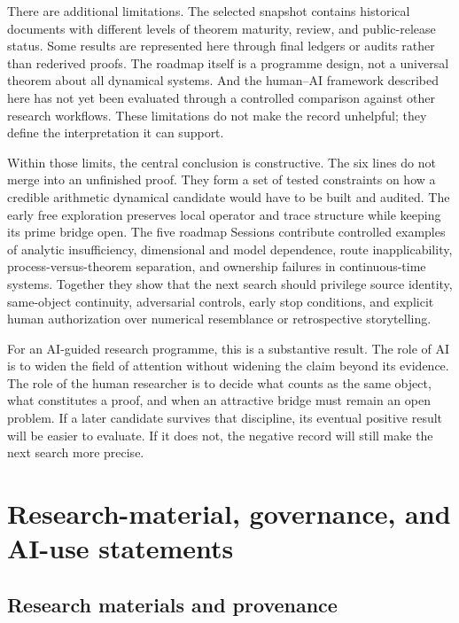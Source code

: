 There are additional limitations. The selected snapshot contains historical documents with different levels of theorem maturity, review, and public-release status. Some results are represented here through final ledgers or audits rather than rederived proofs. The roadmap itself is a programme design, not a universal theorem about all dynamical systems. And the human--AI framework described here has not yet been evaluated through a controlled comparison against other research workflows. These limitations do not make the record unhelpful; they define the interpretation it can support.

Within those limits, the central conclusion is constructive. The six lines do not merge into an unfinished proof. They form a set of tested constraints on how a credible arithmetic dynamical candidate would have to be built and audited. The early free exploration preserves local operator and trace structure while keeping its prime bridge open. The five roadmap Sessions contribute controlled examples of analytic insufficiency, dimensional and model dependence, route inapplicability, process-versus-theorem separation, and ownership failures in continuous-time systems. Together they show that the next search should privilege source identity, same-object continuity, adversarial controls, early stop conditions, and explicit human authorization over numerical resemblance or retrospective storytelling.

For an AI-guided research programme, this is a substantive result. The role of AI is to widen the field of attention without widening the claim beyond its evidence. The role of the human researcher is to decide what counts as the same object, what constitutes a proof, and when an attractive bridge must remain an open problem. If a later candidate survives that discipline, its eventual positive result will be easier to evaluate. If it does not, the negative record will still make the next search more precise.

\hypertarget{research-material-governance-and-ai-use-statements}{%
\section{Research-material, governance, and AI-use statements}\label{research-material-governance-and-ai-use-statements}}

\hypertarget{research-materials-and-provenance}{%
\subsection{Research materials and provenance}\label{research-materials-and-provenance}}

